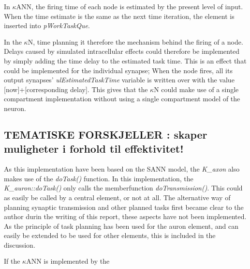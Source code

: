 
		In $\kappa$ANN, the firing time of each node is estimated by the present level of input. 
		When the time estimate is the same as the next time iteration, the element is inserted into \emph{pWorkTaskQue}.
		
		In the $\kappa$N, time planning it therefore the mechanism behind the firing of a node.
		Delays caused by simulated intracellular effects could therefore be implemented by simply adding the time delay to the estimated task time.
		This is an effect that could be implemented for the individual synapse;
			When the node fires, all its output synapses' \emph{ulEstimatedTaskTime} variable is written over with the value [now]+[corresponding delay].
		This gives that the $\kappa$N could make use of a single compartment implementation without using a single compartment model of the neuron.

\subsection{TEMATISKE FORSKJELLER : skaper muligheter i forhold til effektivitet!}
		As this implementation have been based on the SANN model, the \emph{K\_axon} also makes use of the \emph{doTask()} function.
		In this implementation, the \emph{K\_auron::doTask()} only calls the memberfunction \emph{doTransmission()}. This could as easily be called by a central element, or not at all. %
		The alternative way of planning synaptic transmission and other planned tasks first became clear to the author durin the writing of this report, these aspects have not been implemented.
		As the principle of task planning has been used for the auron element, and can easily be extended to be used for other elements, this is included in the discussion.


		If the $\kappa$ANN is implemented by the 

